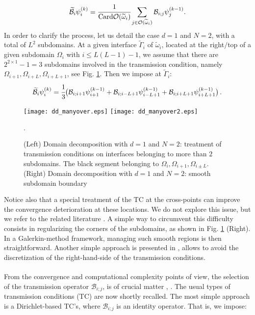 \begin{eqnarray*}
\widetilde{\mathcal{B}}_{i}\psi^{(k)}_i=\cfrac{1}{\textrm{Card}\mathcal{O}(\widetilde{\omega}_i)}\sum_{j \in \mathcal{O}(\widetilde{\omega}_i)}\mathcal{B}_{i;j}\psi^{(k-1)}_j.
\end{eqnarray*}
 In order to clarify the process, let us detail the case $d=1$ and $N=2$, with a total of $L^2$ subdomains. At a given interface $\widetilde{\Gamma}_i$ of $\widetilde{\omega}_i$, located at the right$/$top of a given subdomain $\Omega_i$ with $i\leq L(L-1)-1$, we assume that there are $2^{2\times 1}-1=3$ subdomains involved in the transmission condition, namely $\Omega_{i+1},\Omega_{i+L},\Omega_{i+L+1}$, see Fig. \ref{ddm3}. Then we impose at $\widetilde{\Gamma}_i$:
\begin{eqnarray*}
\widetilde{\mathcal{B}}_{i}\psi^{(k)}_i=\cfrac{1}{3}\big(\mathcal{B}_{i;i+1}\psi^{(k-1)}_{i+1}+\mathcal{B}_{i;i-L+1}\psi^{(k-1)}_{i-L+1}+\mathcal{B}_{i;i+L+1}\psi^{(k-1)}_{i+L+1}\big) \, .
\end{eqnarray*}
\begin{figure}[!ht]
\begin{center}
\hspace*{1mm}\texttt{[image: dd\_manyover.eps]}
\hspace*{1mm}\texttt{[image: dd\_manyover2.eps]}
\caption{(Left) Domain decomposition with $d=1$ and $N=2$: treatment of transmission conditions on interfaces belonging to more than $2$ subdomains. The black segment belonging to $\Omega_{i},\Omega_{i+1},\Omega_{i \pm L}$. (Right) Domain decomposition with $d=1$ and $N=2$: smooth subdomain boundary}.
\label{ddm3}
\end{center}
\end{figure}
Notice also that a special treatment of the TC at the cross-points can improve the convergence deterioration at these locations. We do not explore this issue, but we refer to the related literature \cite{CP1,CP2}. A simple way to circumvent this difficulty consists in regularizing the corners of the subdomains, as shown in Fig. \ref{ddm3} (Right). In a Galerkin-method framework, managing such smooth regions is then straightforward. Another simple approach is presented in \cite{stcyr}, allows to avoid the discretization of the right-hand-side of the transmission conditions.
\\
\\
 From the convergence and computational complexity points of view, the selection of the transmission operator $\mathcal{B}_{i;j}$, is of crucial matter \cite{lorin-TBS}, \cite{halpern2}. The usual types of transmission conditions (TC) are now shortly recalled. The most simple approach is a Dirichlet-based TC's, where $\mathcal{B}_{i;j}$ is an identity operator. That is, we impose:
